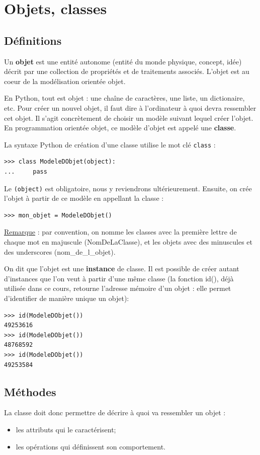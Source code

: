 \documentclass[12pt, a4paper]{article}
\begin{document}
\section{Objets, classes}
\subsection{Définitions}
Un \textbf{objet} est une entité autonome (entité du monde physique, concept, idée) décrit par une collection de propriétés et de traitements associés. L'objet est au coeur de la modélisation orientée objet.

En Python, tout est objet : une chaîne de caractères, une liste, un dictionaire, etc. Pour créer un nouvel objet, il faut dire à l'ordinateur à quoi devra ressembler cet objet. Il s'agit concrètement de choisir un modèle suivant lequel créer l'objet. En programmation orientée objet, ce modèle d'objet est appelé une \textbf{classe}.

La syntaxe Python de création d'une classe utilise le mot clé \lstinline{class} :
\begin{lstlisting}
>>> class ModeleDObjet(object):
...     pass
\end{lstlisting}

Le \lstinline{(object)} est obligatoire, nous y reviendrons ultérieurement. Ensuite, on crée l'objet à partir de ce modèle en appellant la classe :
\begin{lstlisting}
>>> mon_objet = ModeleDObjet()
\end{lstlisting}

\underline{Remarque} : par convention, on nomme les classes avec la première lettre de chaque mot en majuscule (NomDeLaClasse), et les objets avec des minuscules et des underscores (nom\_de\_l\_objet).

On dit que l'objet est une \textbf{instance} de classe. Il est possible de créer autant d'instances que l'on veut à partir d'une même classe (la fonction id(), déjà utilisée dans ce cours, retourne l'adresse mémoire d'un objet : elle permet d'identifier de manière unique un objet):
\begin{lstlisting}
>>> id(ModeleDObjet())
49253616
>>> id(ModeleDObjet())
48768592
>>> id(ModeleDObjet())
49253584
\end{lstlisting}


\subsection{Méthodes}
La classe doit donc permettre de décrire à quoi va ressembler un objet :
\begin{itemize}
	\item les attributs qui le caractérisent;
	\item les opérations qui définissent son comportement.
\end{itemize}
\end{document}
